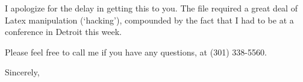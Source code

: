 \begin{letter}
I apologize for the delay in getting this to you. 
The file required a great deal of Latex manipulation (`hacking'),
compounded by the fact that I had to be at a conference in Detroit this week.

Please feel free to call me if you have any questions, at (301) 338-5560.

\closing{Sincerely,}
\end{letter}







